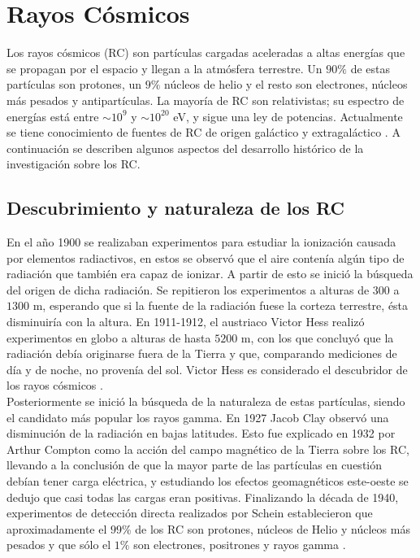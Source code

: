 \section{Rayos Cósmicos}
Los rayos cósmicos (RC) son partículas cargadas aceleradas a altas energías que se propagan por el espacio y llegan a la atmósfera terrestre. Un $90\%$ de estas partículas son protones, un $9\%$ núcleos de helio y el resto son electrones, núcleos más pesados y antipartículas. La mayoría de RC son relativistas; su espectro de energías está entre $\sim 10^9$ y $\sim 10^{20}$ eV, y sigue una ley de potencias. Actualmente se tiene conocimiento de fuentes de RC de origen galáctico y extragaláctico \cite{Gaisser1990}. A continuación se describen algunos aspectos del desarrollo histórico de la investigación sobre los RC.
	
	\subsection{Descubrimiento y naturaleza de los RC}
	En el año 1900 se realizaban experimentos para estudiar la ionización causada por elementos radiactivos, en estos se observó que el aire contenía algún tipo de radiación que también era capaz de ionizar. A partir de esto se inició la búsqueda del origen de dicha radiación. Se repitieron los experimentos a alturas de $300$ a $1300$ m, esperando que si la fuente de la radiación fuese la corteza terrestre, ésta disminuiría con la altura. En 1911-1912, el austriaco Victor Hess realizó experimentos en globo a alturas de hasta $5200$ m, con los que concluyó que la radiación debía originarse fuera de la Tierra y que, comparando mediciones de día y de noche, no provenía del sol. Victor Hess es considerado el descubridor de los rayos cósmicos \cite{Extremas}.\\
	
	Posteriormente se inició la búsqueda de la naturaleza de estas partículas, siendo el candidato más popular los rayos gamma. En 1927 Jacob Clay observó una disminución de la radiación en bajas latitudes. Esto fue explicado en 1932 por Arthur Compton como la acción del campo magnético de la Tierra sobre los RC, llevando a la conclusión de que la mayor parte de las partículas en cuestión debían tener carga eléctrica, y estudiando los efectos geomagnéticos este-oeste se dedujo que casi todas las cargas eran positivas. Finalizando la década de 1940, experimentos de detección directa realizados por Schein establecieron que aproximadamente el $99\%$ de los RC son protones, núcleos de Helio y núcleos más pesados y que sólo el $1\%$ son electrones, positrones y rayos gamma \cite{Dorman2004}.

